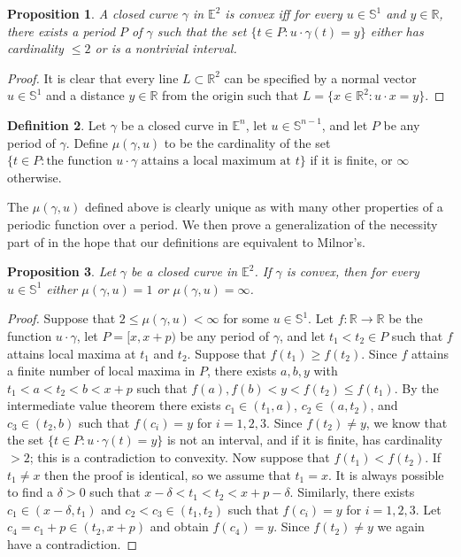 \documentclass{amsart}
\newtheorem{proposition}{Proposition}[section]
\theoremstyle{definition}
\newtheorem{definition}[proposition]{Definition}
\begin{document}
\begin{proposition}
    A closed curve $\gamma$ in $\mathbb{E}^2$ is convex iff
    for every $u\in\mathbb{S}^1$ and $y\in\mathbb{R}$,
    there exists a period $P$ of $\gamma$ such that
    the set $\{t\in P:u\cdot\gamma(t)=y\}$ either
    has cardinality $\le2$ or is a nontrivial interval.
\end{proposition}

\begin{proof}
    It is clear that every line $L\subset\mathbb{R}^2$
    can be specified by a normal vector $u\in\mathbb{S}^1$
    and a distance $y\in\mathbb{R}$ from the origin such that
    $L=\{x\in\mathbb{R}^2:u\cdot x=y\}$.
\end{proof}

\begin{definition}
    Let $\gamma$ be a closed curve in $\mathbb{E}^n$,
    let $u\in\mathbb{S}^{n-1}$,
    and let $P$ be any period of $\gamma$.
    Define $\mu(\gamma,u)$ to be the cardinality of the set
    $\{t\in P:\text{the function }u\cdot\gamma\text{ attains a local maximum at }t\}$
    if it is finite, or $\infty$ otherwise.
\end{definition}

The $\mu(\gamma,u)$ defined above is clearly unique as with
many other properties of a periodic function over a period.
We then prove a generalization of the necessity part
of \cite[Lemma 3.3]{milnor} in the hope that
our definitions are equivalent to Milnor's.

\begin{proposition}
    Let $\gamma$ be a closed curve in $\mathbb{E}^2$.
    If $\gamma$ is convex, then for every $u\in\mathbb{S}^1$
    either $\mu(\gamma,u)=1$ or $\mu(\gamma,u)=\infty$.
\end{proposition}

\begin{proof}
    Suppose that $2\le\mu(\gamma,u)<\infty$ for some $u\in\mathbb{S}^1$.
    Let $f:\mathbb{R}\to\mathbb{R}$ be the function $u\cdot\gamma$,
    let $P=[x,x+p)$ be any period of $\gamma$, and let $t_1<t_2\in P$
    such that $f$ attains local maxima at $t_1$ and $t_2$.
    Suppose that $f(t_1)\ge f(t_2)$.
    Since $f$ attains a finite number of local maxima in $P$,
    there exists $a,b,y$ with $t_1<a<t_2<b<x+p$ such that
    $f(a),f(b)<y<f(t_2)\le f(t_1)$.
    By the intermediate value theorem there exists
    $c_1\in(t_1,a)$, $c_2\in(a,t_2)$, and $c_3\in(t_2,b)$ such that
    $f(c_i)=y$ for $i=1,2,3$. Since $f(t_2)\ne y$, we know that
    the set $\{t\in P:u\cdot\gamma(t)=y\}$ is not an interval,
    and if it is finite, has cardinality $>2$; this is a contradiction
    to convexity. Now suppose that $f(t_1)<f(t_2)$.
    If $t_1\ne x$ then the proof is identical,
    so we assume that $t_1=x$. It is always possible to find
    a $\delta>0$ such that $x-\delta<t_1<t_2<x+p-\delta$.
    Similarly, there exists $c_1\in(x-\delta,t_1)$ and
    $c_2<c_3\in(t_1,t_2)$ such that $f(c_i)=y$ for $i=1,2,3$.
    Let $c_4=c_1+p\in(t_2,x+p)$ and obtain $f(c_4)=y$.
    Since $f(t_2)\ne y$ we again have a contradiction.
\end{proof}
\end{document}
